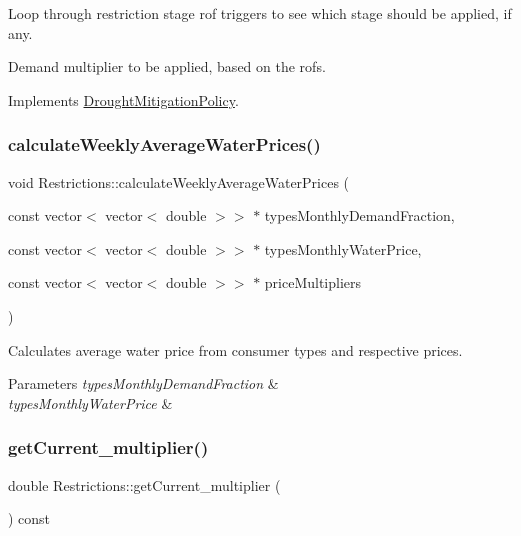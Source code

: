 Loop through restriction stage rof triggers to see which stage should be applied, if any.

Demand multiplier to be applied, based on the rofs. 

Implements \mbox{\hyperlink{classDroughtMitigationPolicy_a76c1a85eaf7707306fe173b6437cc31d_a76c1a85eaf7707306fe173b6437cc31d}{Drought\+Mitigation\+Policy}}.

\mbox{\label{classRestrictions_a5155dcecc8b995c1793fa400f1533959_a5155dcecc8b995c1793fa400f1533959}} 
\subsubsection{\texorpdfstring{calculate\+Weekly\+Average\+Water\+Prices()}{calculateWeeklyAverageWaterPrices()}}
{\footnotesize\ttfamily void Restrictions\+::calculate\+Weekly\+Average\+Water\+Prices (\begin{DoxyParamCaption}\item[{const vector$<$ vector$<$ double $>$$>$ $\ast$}]{types\+Monthly\+Demand\+Fraction,  }\item[{const vector$<$ vector$<$ double $>$$>$ $\ast$}]{types\+Monthly\+Water\+Price,  }\item[{const vector$<$ vector$<$ double $>$$>$ $\ast$}]{price\+Multipliers }\end{DoxyParamCaption})}

Calculates average water price from consumer types and respective prices. 
\begin{DoxyParams}{Parameters}
{\em types\+Monthly\+Demand\+Fraction} & \\
\hline
{\em types\+Monthly\+Water\+Price} & \\
\hline
\end{DoxyParams}
\mbox{\label{classRestrictions_a4282debfe00607f87f59a08ec1844d40_a4282debfe00607f87f59a08ec1844d40}} 
\subsubsection{\texorpdfstring{get\+Current\+\_\+multiplier()}{getCurrent\_multiplier()}}
{\footnotesize\ttfamily double Restrictions\+::get\+Current\+\_\+multiplier (\begin{DoxyParamCaption}{ }\end{DoxyParamCaption}) const}

